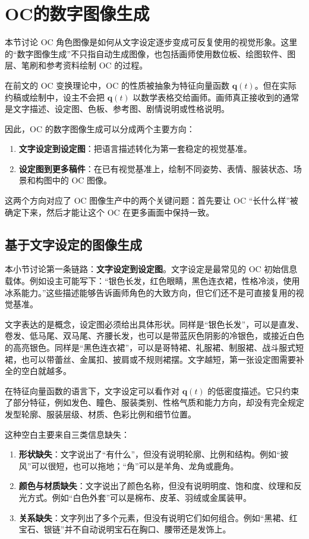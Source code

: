 \section{OC的数字图像生成}\label{sec:ocimage}
本节讨论 OC 角色图像是如何从文字设定逐步变成可反复使用的视觉形象。这里的“数字图像生成”不只指自动生成图像，也包括画师使用数位板、绘图软件、图层、笔刷和参考资料绘制 OC 的过程。

在前文的 OC 变换理论中，OC 的性质被抽象为特征向量函数 $\mathbf{q}(t)$。但在实际约稿或绘制中，设主不会把 $\mathbf{q}(t)$ 以数学表格交给画师。画师真正接收到的通常是文字描述、设定图、色板、参考图、剧情说明或性格说明。

因此，OC 的数字图像生成可以分成两个主要方向：
\begin{enumerate}
    \item \textbf{文字设定到设定图}：把语言描述转化为第一套稳定的视觉基准。
    \item \textbf{设定图到更多稿件}：在已有视觉基准上，绘制不同姿势、表情、服装状态、场景和构图中的 OC 图像。
\end{enumerate}

这两个方向对应了 OC 图像生产中的两个关键问题：首先要让 OC “长什么样”被确定下来，然后才能让这个 OC 在更多画面中保持一致。

\subsection{基于文字设定的图像生成}\label{subsec:text_based_gen}

本小节讨论第一条链路：\textbf{文字设定到设定图}。文字设定是最常见的 OC 初始信息载体。例如设主可能写下：“银色长发，红色眼睛，黑色连衣裙，性格冷淡，使用冰系能力。”这些描述能够告诉画师角色的大致方向，但它们还不是可直接复用的视觉基准。

文字表达的是概念，设定图必须给出具体形状。同样是“银色长发”，可以是直发、卷发、低马尾、双马尾、齐腰长发，也可以是带蓝灰色阴影的冷银色，或接近白色的高亮银色。同样是“黑色连衣裙”，可以是哥特裙、礼服裙、制服裙、战斗服式短裙，也可以带蕾丝、金属扣、披肩或不规则裙摆。文字越短，第一张设定图需要补全的空白就越多。

在特征向量函数的语言下，文字设定可以看作对 $\mathbf{q}(t)$ 的低密度描述。它只约束了部分特征，例如发色、瞳色、服装类别、性格气质和能力方向，却没有完全规定发型轮廓、服装层级、材质、色彩比例和细节位置。

这种空白主要来自三类信息缺失：
\begin{enumerate}
    \item \textbf{形状缺失}：文字说出了“有什么”，但没有说明轮廓、比例和结构。例如“披风”可以很短，也可以拖地；“角”可以是羊角、龙角或鹿角。
    \item \textbf{颜色与材质缺失}：文字说出了颜色名称，但没有说明明度、饱和度、纹理和反光方式。例如“白色外套”可以是棉布、皮革、羽绒或金属装甲。
    \item \textbf{关系缺失}：文字列出了多个元素，但没有说明它们如何组合。例如“黑裙、红宝石、银链”并不自动说明宝石在胸口、腰带还是发饰上。
\end{enumerate}

